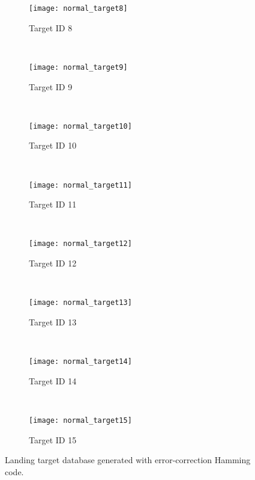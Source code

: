 \begin{figure}[!ht]
	
    \begin{subfigure}[b]{0.23\textwidth}
		\centering
		\texttt{[image: normal\_target8]}	
		\caption{Target ID 8}
	\end{subfigure}
    ~ %
    \begin{subfigure}[b]{0.23\textwidth}
		\centering
		\texttt{[image: normal\_target9]}	
		\caption{Target ID 9}
	\end{subfigure}
	~ %
    \begin{subfigure}[b]{0.23\textwidth}
		\centering
		\texttt{[image: normal\_target10]}	
		\caption{Target ID 10}
	\end{subfigure}
	~ %
    \begin{subfigure}[b]{0.23\textwidth}
		\centering
		\texttt{[image: normal\_target11]}	
		\caption{Target ID 11}
	\end{subfigure} \\[2ex]    
    
    
    \begin{subfigure}[b]{0.23\textwidth}
		\centering
		\texttt{[image: normal\_target12]}	
		\caption{Target ID 12}
	\end{subfigure}
    ~ %
    \begin{subfigure}[b]{0.23\textwidth}
		\centering
		\texttt{[image: normal\_target13]}	
		\caption{Target ID 13}
	\end{subfigure} 
     ~ %
    \begin{subfigure}[b]{0.23\textwidth}
		\centering
		\texttt{[image: normal\_target14]}	
		\caption{Target ID 14}
	\end{subfigure}
	~ %
    \begin{subfigure}[b]{0.23\textwidth}
		\centering
		\texttt{[image: normal\_target15]}	
		\caption{Target ID 15}
	\end{subfigure}    
		
    \caption{Landing target database generated with error-correction Hamming code.}
    \label{fig:landing_target_database}
\end{figure}

